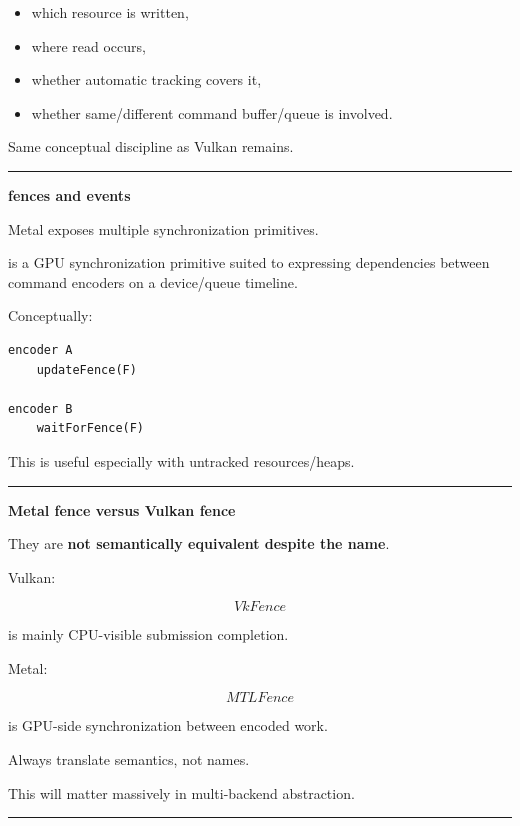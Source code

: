 \begin{itemize}
\tightlist
\item
  which resource is written,
\item
  where read occurs,
\item
  whether automatic tracking covers it,
\item
  whether same/different command buffer/queue is involved.
\end{itemize}

Same conceptual discipline as Vulkan remains.

\begin{center}\rule{0.5\linewidth}{0.5pt}\end{center}

\textbf{fences and events}

Metal exposes multiple synchronization primitives.

 is a GPU synchronization primitive suited to expressing dependencies between command encoders on a device/queue timeline.

Conceptually:

\begin{verbatim}
encoder A
    updateFence(F)

encoder B
    waitForFence(F)
\end{verbatim}

This is useful especially with untracked resources/heaps.

\begin{center}\rule{0.5\linewidth}{0.5pt}\end{center}

\textbf{Metal fence versus Vulkan fence}

They are \textbf{not semantically equivalent despite the name}.

Vulkan:

\[
VkFence
\]

is mainly CPU-visible submission completion.

Metal:

\[
MTLFence
\]

is GPU-side synchronization between encoded work.

Always translate semantics, not names.

This will matter massively in multi-backend abstraction.

\begin{center}\rule{0.5\linewidth}{0.5pt}\end{center}

